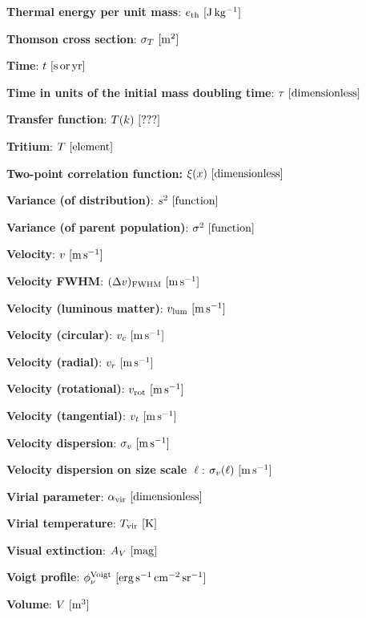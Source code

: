 \documentclass[a4paper,10pt]{article}
\begin{document}
{\noindent}\textbf{Thermal energy per unit mass}: $e_\mathrm{th} ~ [{\rm J\,kg^{-1}}]$

{\noindent}\textbf{Thomson cross section}: $\sigma_T ~ [{\rm m^2}]$

{\noindent}\textbf{Time}: $t ~ [{\rm s\,or\,yr}]$

{\noindent}\textbf{Time in units of the initial mass doubling time}: $\tau ~ [{\rm dimensionless}]$

{\noindent}\textbf{Transfer function}: $T(k) ~ [{\rm ???}]$

{\noindent}\textbf{Tritium}: $T ~ [{\rm element}]$

{\noindent}\textbf{Two-point correlation function:} $\xi(x) ~ [{\rm dimensionless}]$

{\noindent}\textbf{Variance (of distribution)}: $s^2 ~ [{\rm function}]$

{\noindent}\textbf{Variance (of parent population)}: $\sigma^2 ~ [{\rm function}]$

{\noindent}\textbf{Velocity}: $v ~ [{\rm m\,s^{-1}}]$

{\noindent}\textbf{Velocity FWHM}: $(\Delta v)_{\rm FWHM} ~ [{\rm m\,s^{-1}}]$

{\noindent}\textbf{Velocity (luminous matter)}: $v_{\rm lum} ~ [{\rm m\,s^{-1}}]$

{\noindent}\textbf{Velocity (circular)}: $v_c ~ [{\rm m\,s^{-1}}]$

{\noindent}\textbf{Velocity (radial)}: $v_r ~ [{\rm m\,s^{-1}}]$

{\noindent}\textbf{Velocity (rotational)}: $v_\mathrm{rot} ~ [{\rm m\,s^{-1}}]$

{\noindent}\textbf{Velocity (tangential)}: $v_t ~ [{\rm m\,s^{-1}}]$

{\noindent}\textbf{Velocity dispersion}: $\sigma_v ~ [{\rm m\,s^{-1}}]$

{\noindent}\textbf{Velocity dispersion on size scale $\ell$}: $\sigma_v(\ell) ~ [{\rm m\,s^{-1}}]$

{\noindent}\textbf{Virial parameter}: $\alpha_\mathrm{vir} ~ [{\rm dimensionless}]$

{\noindent}\textbf{Virial temperature}: $T_\mathrm{vir} ~
[{\rm K}]$

{\noindent}\textbf{Visual extinction}: $A_V ~ [{\rm mag}]$

{\noindent}\textbf{Voigt profile}: $\phi_\nu^{\rm Voigt}  ~ [{\rm erg\,s^{-1}\,cm^{-2}\,sr^{-1}}]$

{\noindent}\textbf{Volume}: $V ~ [{\rm m^3}]$
\end{document}
